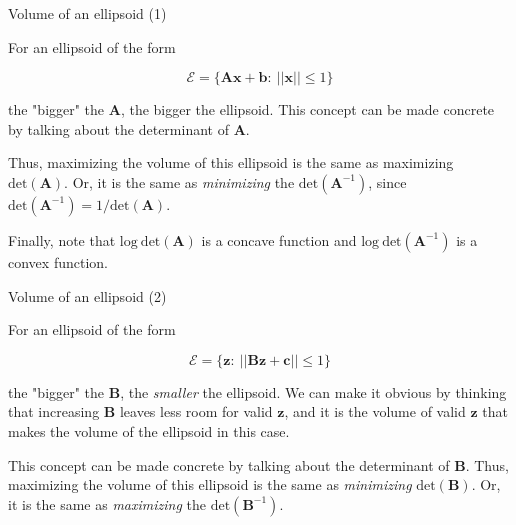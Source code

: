 \documentclass{beamer}
\begin{document}
\begin{frame}{Volume of an ellipsoid (1)}
\begin{flushleft}

For an ellipsoid of the form

\begin{equation}
    \mathcal{E} = \{ \mathbf{A}\mathbf{x} + \mathbf{b}: \ || \mathbf{x} || \leq 1 \}
\end{equation}

the "bigger" the $\mathbf{A}$, the bigger the ellipsoid. This concept can be made concrete by talking about the determinant of $\mathbf{A}$.

\bigskip

Thus, maximizing the volume of this ellipsoid is the same as maximizing $\text{det}(\mathbf{A})$. Or, it is the same as \emph{minimizing} the $\text{det}(\mathbf{A}^{-1})$, since $\text{det}(\mathbf{A}^{-1}) = 1 / \text{det}(\mathbf{A})$.

\bigskip

Finally, note that $\text{log} \ \text{det}(\mathbf{A})$ is a concave function and $\text{log} \ \text{det}(\mathbf{A}^{-1})$  is a convex function.

 
\end{flushleft}
\end{frame}




\begin{frame}{Volume of an ellipsoid (2)}
\begin{flushleft}

For an ellipsoid of the form

\begin{equation}
    \mathcal{E} = \{ \mathbf{z}: \ || \mathbf{B}\mathbf{z} + \mathbf{c} || \leq 1 \}
\end{equation}

the "bigger" the $\mathbf{B}$, the \emph{smaller} the ellipsoid. We can make it obvious by thinking that increasing $\mathbf{B}$ leaves less room for valid $\mathbf{z}$, and it is the volume of valid $\mathbf{z}$ that makes the volume of the ellipsoid in this case.

\bigskip

This concept can be made concrete by talking about the determinant of $\mathbf{B}$. Thus, maximizing the volume of this ellipsoid is the same as \emph{minimizing} $\text{det}(\mathbf{B})$. Or, it is the same as \emph{maximizing} the $\text{det}(\mathbf{B}^{-1})$.
 
\end{flushleft}
\end{frame}
\end{document}
